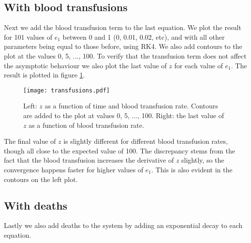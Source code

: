 \documentclass[a4paper,10pt]{article}
\begin{document}
	\subsection*{With blood transfusions}
	Next we add the blood transfusion term to the last equation. We plot the result for 101 values of $ e_1 $ between 0 and 1 (0, 0.01, 0.02, etc), and with all other parameters being equal to those before, using RK4. We also add contours to the plot at the values 0, 5, ..., 100. To verify that the transfusion term does not affect the asymptotic behaviour we also plot the last value of $ z $ for each value of $ e_1 $. The result is plotted in figure \ref{fig:transfusions}. 
	\begin{figure}[H]
		\centering
		\texttt{[image: transfusions.pdf]}
		\caption{Left: $ z $ as a function of time and blood transfusion rate. Contours are added to the plot at values 0, 5, ..., 100. Right: the last value of $ z $ as a function of blood transfusion rate.}
		\label{fig:transfusions}
	\end{figure}
	The final value of $ z $ is slightly different for different blood transfusion rates, though all close to the expected value of 100. The discrepancy stems from the fact that the blood transfusion increases the derivative of $ z $ slightly, so the convergence happens faster for higher values of $ e_1 $. This is also evident in the contours on the left plot.
	
	\subsection*{With deaths}
	Lastly we also add deaths to the system by adding an exponential decay to each equation.
	
	\newpage
\end{document}
